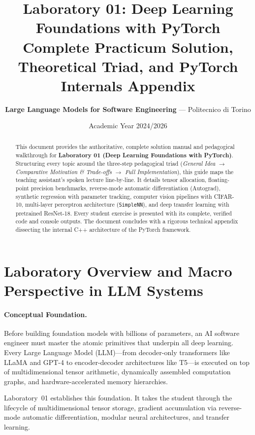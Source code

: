 \documentclass[11pt,a4paper]{article}
\title{\vspace{-1.5cm}\LARGE\bfseries\color{politoNavy}Laboratory 01: Deep Learning Foundations with PyTorch\\[0.3em]
\Large\mdseries\color{steelBlue}Complete Practicum Solution, Theoretical Triad, and PyTorch Internals Appendix}
\author{\textbf{Large Language Models for Software Engineering} --- Politecnico di Torino}
\date{Academic Year 2024/2026}
\begin{document}
\maketitle
\thispagestyle{plain}

\begin{abstract}
This document provides the authoritative, complete solution manual and pedagogical walkthrough for \textbf{Laboratory 01 (Deep Learning Foundations with PyTorch)}. Structuring every topic around the three-step pedagogical triad (\textit{General Idea $\to$ Comparative Motivation \& Trade-offs $\to$ Full Implementation}), this guide maps the teaching assistant's spoken lecture line-by-line. It details tensor allocation, floating-point precision benchmarks, reverse-mode automatic differentiation (Autograd), synthetic regression with parameter tracking, computer vision pipelines with CIFAR-10, multi-layer perceptron architecture (\texttt{SimpleNN}), and deep transfer learning with pretrained ResNet-18. Every student exercise is presented with its complete, verified code and console outputs. The document concludes with a rigorous technical appendix dissecting the internal C++ architecture of the PyTorch framework.
\end{abstract}

\tableofcontents
\clearpage

\section[Macro Perspective in LLM Systems]{Laboratory Overview and Macro Perspective in LLM Systems}

\paragraph{Conceptual Foundation.}
Before building foundation models with billions of parameters, an AI software engineer must master the atomic primitives that underpin all deep learning. Every Large Language Model (LLM)---from decoder-only transformers like LLaMA and GPT-4 to encoder-decoder architectures like T5---is executed on top of multidimensional tensor arithmetic, dynamically assembled computation graphs, and hardware-accelerated memory hierarchies. 

Laboratory~01 establishes this foundation. It takes the student through the lifecycle of multidimensional tensor storage, gradient accumulation via reverse-mode automatic differentiation, modular neural architectures, and transfer learning.
\end{document}
